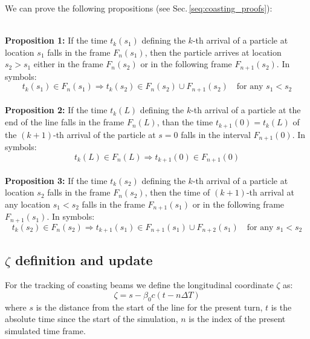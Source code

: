 We can prove the following propositions (see Sec.\,\ref{seq:coasting_proofs}):

~\\
\textbf{Proposition 1:} If the time $t_k(s_1)$ defining the $k$-th arrival of a particle at location $s_1$ falls in the frame $F_n(s_1)$, then the particle arrives at location $s_2 > s_1$ either in the frame $F_n(s_2)$ or in the following frame $F_{n+1}(s_2)$. In symbols:
\begin{equation}
t_k(s_1) \in F_n(s_1) \Rightarrow t_k(s_2) \in F_n(s_2) \cup  F_{n+1}(s_2) \quad \text{for any } s_1 < s_2 
\end{equation}
~\\
\textbf{Proposition 2:} If the time $t_k(L)$ defining the $k$-th arrival of a particle at the end of the line falls in the frame $F_n(L)$, than the time $t_{k+1}(0) = t_k(L)$ of the $(k+1)$-th arrival of the particle at $s=0$ falls in the interval 
$F_{n+1}(0)$. In symbols:
\begin{equation}
t_k(L) \in F_n(L) \Rightarrow t_{k+1}(0) \in F_{n+1}(0)
\end{equation}
~\\
\textbf{Proposition 3:} If the time $t_k(s_2)$ defining the $k$-th arrival of a particle at location $s_2$ falls in the frame $F_n(s_2)$, then the time of $(k+1)$-th arrival at any location $s_1 < s_2$ falls in the frame $F_{n+1}(s_1)$ or in the following frame $F_{n+1}(s_1)$. In symbols:
\begin{equation}
t_k(s_2) \in F_n(s_2) \Rightarrow t_{k+1}(s_1) \in F_{n+1}(s_1) \cup  F_{n+2}(s_1) \quad \text{for any } s_1 < s_2 
\end{equation}

\subsection{$\zeta$ definition and update}

For the tracking of coasting beams we define the longitudinal coordinate $\zeta$ as:
\begin{equation}
\zeta = s  - \beta_0 c (t - n\Delta T)
\end{equation}
where $s$ is the distance from the start of the line for the present turn, $t$ is the absolute time since the start of the simulation, $n$ is the index of the present simulated time frame.

